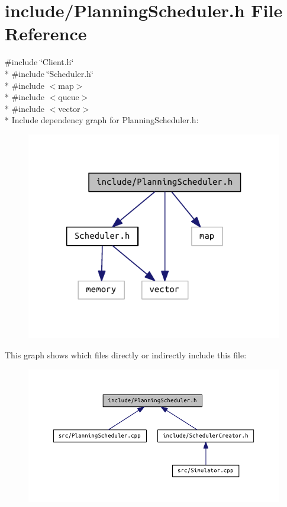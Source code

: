 \section{include/\+Planning\+Scheduler.h File Reference}
\label{_planning_scheduler_8h}
{\ttfamily \#include \char`\"{}Client.\+h\char`\"{}}\\*
{\ttfamily \#include \char`\"{}Scheduler.\+h\char`\"{}}\\*
{\ttfamily \#include $<$map$>$}\\*
{\ttfamily \#include $<$queue$>$}\\*
{\ttfamily \#include $<$vector$>$}\\*
Include dependency graph for Planning\+Scheduler.\+h\+:\nopagebreak
\begin{figure}[H]
\begin{center}
\leavevmode
\includegraphics[width=350pt]{_planning_scheduler_8h__incl}
\end{center}
\end{figure}
This graph shows which files directly or indirectly include this file\+:\nopagebreak
\begin{figure}[H]
\begin{center}
\leavevmode
\includegraphics[width=330pt]{_planning_scheduler_8h__dep__incl}
\end{center}
\end{figure}
